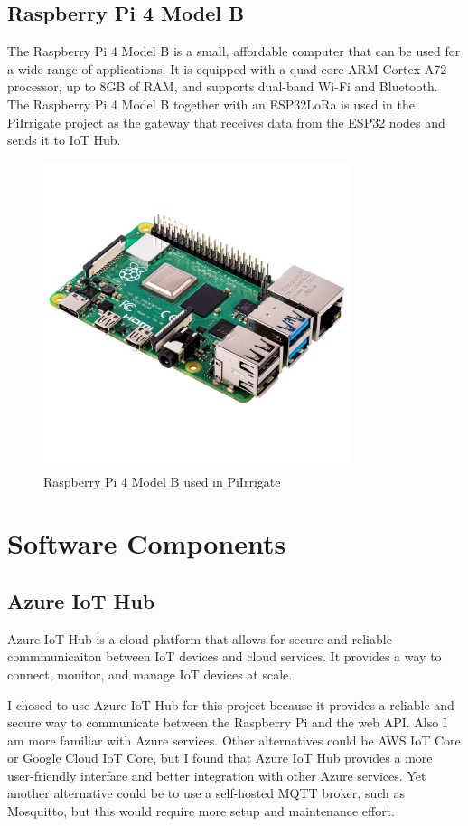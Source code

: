 \subsection{Raspberry Pi 4 Model B}
The Raspberry Pi 4 Model B is a small, affordable computer that can be used for a wide range of applications.
It is equipped with a quad-core ARM Cortex-A72 processor, up to 8GB of RAM, and supports dual-band Wi-Fi and Bluetooth.
The Raspberry Pi 4 Model B together with an ESP32LoRa is used in the PiIrrigate project as the gateway that receives data from the ESP32 nodes
and sends it to IoT Hub.
\begin{figure}[H]
    \centering
    \includegraphics[width=0.8\textwidth]{images/raspberrypi.jpg}
    \caption{Raspberry Pi 4 Model B used in PiIrrigate}
    \label{fig:raspberrypi}
\end{figure}


\section{Software Components}
\subsection{Azure IoT Hub}
Azure IoT Hub is a cloud platform that allows for secure and reliable commmunicaiton between IoT devices and
cloud services. It provides a way to connect, monitor, and manage IoT devices at scale.

I chosed to use Azure IoT Hub for this project because it provides a reliable and secure way to
communicate between the Raspberry Pi and the web API. Also I am more familiar with Azure services. 
Other alternatives could be AWS IoT Core or Google Cloud IoT Core, but I found that Azure IoT Hub
provides a more user-friendly interface and better integration with other Azure services. 
Yet another alternative could be to use a self-hosted MQTT broker, 
such as Mosquitto, but this would require more setup and maintenance effort.

